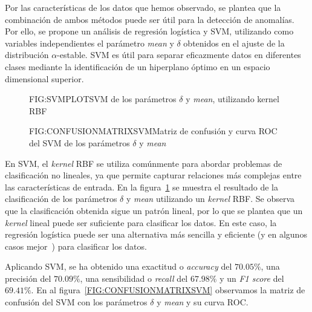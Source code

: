 Por las características de los datos que hemos observado, se plantea que la combinación de ambos métodos puede ser útil para la detección de anomalías.
Por ello, se propone un análisis de regresión logística y \ac{SVM}, utilizando como variables independientes el parámetro \textit{mean} y $\delta$ obtenidos en el ajuste de la distribución $\alpha$-estable. SVM es útil para separar eficazmente datos en diferentes clases mediante la identificación de un hiperplano óptimo en un espacio dimensional superior.

\begin{figure}[SVM de los parámetros $\delta$ y \textit{mean}, utilizando kernel RBF]{FIG:SVMPLOT}{SVM de los parámetros $\delta$ y \textit{mean}, utilizando kernel RBF}
    \label{FIG:SVMPLOT}
\end{figure}

\begin{figure}[Matriz de confusión y curva ROC del SVM de los parámetros $\delta$ y \textit{mean}]{FIG:CONFUSIONMATRIXSVM}{Matriz de confusión y curva ROC del SVM de los parámetros $\delta$ y \textit{mean}}
     \quad
\end{figure}

En SVM, el \textit{kernel} \ac{RBF} se utiliza comúnmente para abordar problemas de clasificación no lineales, ya que permite capturar relaciones más complejas entre las características de entrada. En la figura~\ref{FIG:SVMPLOT} se muestra el resultado de la clasificación de los parámetros $\delta$ y \textit{mean} utilizando un \textit{kernel} RBF. 
Se observa que la clasificación obtenida sigue un patrón lineal, por lo que se plantea que un \textit{kernel} lineal puede ser suficiente para clasificar los datos. En este caso, la regresión logística puede ser una alternativa más sencilla y eficiente (y en algunos casos mejor~\cite{salazar2012comparison}) para clasificar los datos.

Aplicando SVM, se ha obtenido una exactitud o \textit{accuracy} del $70.05\%$, una precisión del $70.09\%$, una sensibilidad o \textit{recall} del $67.98\%$ y un \textit{F1 score} del $69.41\%$. En al figura~\ref{FIG:CONFUSIONMATRIXSVM} observamos la matriz de confusión del SVM con los parámetros $\delta$ y \textit{mean} y su curva \ac{ROC}.

